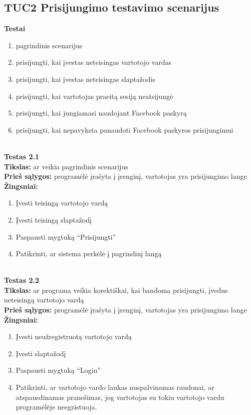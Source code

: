 \documentclass{VUMIFPSkursinis}
\begin{document}
	\subsection{TUC2 Prisijungimo testavimo scenarijus}
		\textbf{Testai}
		\begin{enumerate}[noitemsep,topsep=0pt]
			\item pagrindinis scenarijus
			\item prisijungti, kai įvestas neteisingas vartotojo vardas
			\item prisijungti, kai įvestas neteisingas slaptažodis
			\item prisijungti, kai vartotojas praeitą sesiją neatsijungė
			\item prisijungti, kai jungiamasi naudojant Facebook paskyrą
			\item prisijungti, kai nepavyksta panaudoti Facebook paskyros prisijungimui
		\end{enumerate}
		\textbf{}\\
		\textbf{Testas 2.1}\\
		\textbf{Tikslas:} ar veikia pagrindinis scenarijus\\
		\textbf{Prieš sąlygos:} programėlė įrašyta į įrenginį, vartotojas yra prisijungimo lange\\
		\textbf{Žingsniai:}
		\begin{enumerate}[noitemsep,topsep=0pt]
			\item Įvesti teisingą vartotojo vardą
			\item Įvesti teisingą slaptažodį
			\item Paspausti mygtuką “Prisijungti”
			\item Patikrinti, ar sistema perkėlė į pagrindinį langą
		\end{enumerate}
		\textbf{}\\
		\textbf{Testas 2.2}\\
		\textbf{Tikslas:} ar programa veikia korektiškai, kai bandoma prisijungti, įvedus neteisingą vartotojo vardą\\
		\textbf{Prieš sąlygos:} programėlė įrašyta į įrenginį, vartotojas yra prisijungimo lange\\
		\textbf{Žingsniai:}
		\begin{enumerate}[noitemsep,topsep=0pt]
			\item Įvesti neužregistruotą vartotojo vardą
			\item Įvesti slaptažodį
			\item Paspausti mygtuką “Login”
			\item Patikrinti, ar vartotojo vardo laukas nuspalvinamas raudonai, ar atspausdinamas pranešimas, jog vartotojas su tokiu vartotojo vardu programėlėje neegzistuoja.
		\end{enumerate}
\end{document}
